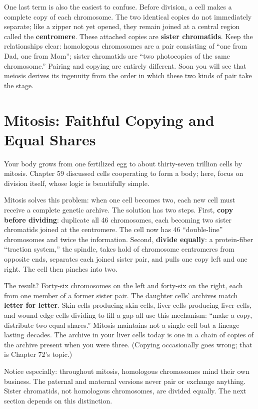 One last term is also the easiest to confuse. Before division, a cell makes a complete copy of each chromosome. The two identical copies do not immediately separate; like a zipper not yet opened, they remain joined at a central region called the \textbf{centromere}. These attached copies are \textbf{sister chromatids}. Keep the relationships clear: homologous chromosomes are a pair consisting of ``one from Dad, one from Mom''; sister chromatids are ``two photocopies of the same chromosome.'' Pairing and copying are entirely different. Soon you will see that meiosis derives its ingenuity from the order in which these two kinds of pair take the stage.

\section{Mitosis: Faithful Copying and Equal Shares}

Your body grows from one fertilized egg to about thirty-seven trillion cells by mitosis. Chapter 59 discussed cells cooperating to form a body; here, focus on division itself, whose logic is beautifully simple.

Mitosis solves this problem: when one cell becomes two, each new cell must receive a complete genetic archive. The solution has two steps. First, \textbf{copy before dividing}: duplicate all 46 chromosomes, each becoming two sister chromatids joined at the centromere. The cell now has 46 ``double-line'' chromosomes and twice the information. Second, \textbf{divide equally}: a protein-fiber ``traction system,'' the spindle, takes hold of chromosome centromeres from opposite ends, separates each joined sister pair, and pulls one copy left and one right. The cell then pinches into two.

The result? Forty-six chromosomes on the left and forty-six on the right, each from one member of a former sister pair. The daughter cells' archives match \textbf{letter for letter}. Skin cells producing skin cells, liver cells producing liver cells, and wound-edge cells dividing to fill a gap all use this mechanism: ``make a copy, distribute two equal shares.'' Mitosis maintains not a single cell but a lineage lasting decades. The archive in your liver cells today is one in a chain of copies of the archive present when you were three. (Copying occasionally goes wrong; that is Chapter 72's topic.)

Notice especially: throughout mitosis, homologous chromosomes mind their own business. The paternal and maternal versions never pair or exchange anything. Sister chromatids, not homologous chromosomes, are divided equally. The next section depends on this distinction.

